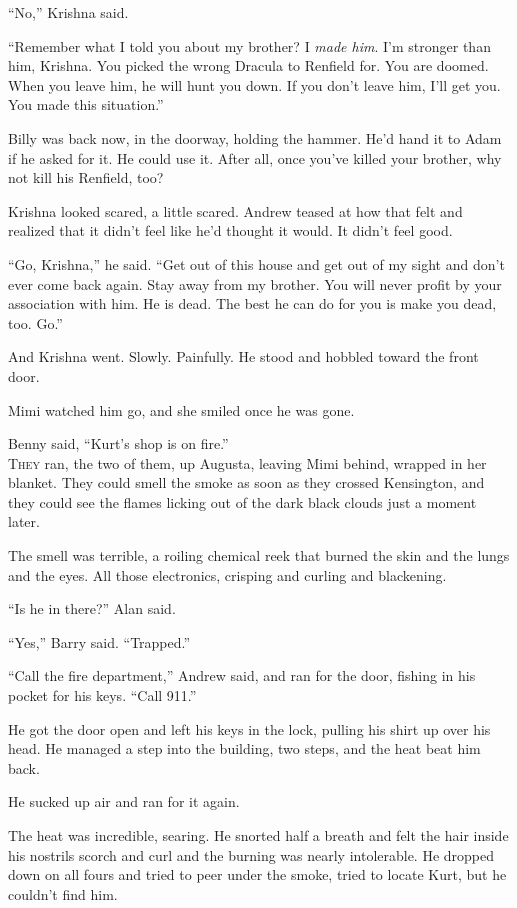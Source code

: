 \documentclass{article}
\begin{document}
``No,'' Krishna said. 

``Remember what I told you about my brother?  I \textit{made him}. 
I'm stronger than him, Krishna.  You picked the wrong Dracula to
Renfield for.  You are doomed.  When you leave him, he will hunt you
down.  If you don't leave him, I'll get you.  You made this
situation.''

Billy was back now, in the doorway, holding the hammer.  He'd hand it
to Adam if he asked for it.  He could use it.  After all, once you've
killed your brother, why not kill his Renfield, too?

Krishna looked scared, a little scared.  Andrew teased at how that
felt and realized that it didn't feel like he'd thought it would.  It
didn't feel good. 

``Go, Krishna,'' he said.  ``Get out of this house and get out of my
sight and don't ever come back again.  Stay away from my brother.  You
will never profit by your association with him.  He is dead.  The best
he can do for you is make you dead, too.  Go.''

And Krishna went.  Slowly.  Painfully.  He stood and hobbled toward
the front door.

Mimi watched him go, and she smiled once he was gone.

Benny said, ``Kurt's shop is on fire.''
\\
\lettrine[lines=3, lhang=.5, nindent=0pt, findent=2pt]{T}{hey} ran, the two of them, up Augusta, leaving Mimi behind, wrapped in
her blanket.  They could smell the smoke as soon as they crossed
Kensington, and they could see the flames licking out of the dark
black clouds just a moment later.

The smell was terrible, a roiling chemical reek that burned the skin
and the lungs and the eyes.  All those electronics, crisping and
curling and blackening.

``Is he in there?'' Alan said. 

``Yes,'' Barry said.  ``Trapped.''

``Call the fire department,'' Andrew said, and ran for the door,
fishing in his pocket for his keys.  ``Call 911.''

He got the door open and left his keys in the lock, pulling his shirt
up over his head.  He managed a step into the building, two steps, and
the heat beat him back. 

He sucked up air and ran for it again. 

The heat was incredible, searing.  He snorted half a breath and felt
the hair inside his nostrils scorch and curl and the burning was
nearly intolerable.  He dropped down on all fours and tried to peer
under the smoke, tried to locate Kurt, but he couldn't find him.
\end{document}
